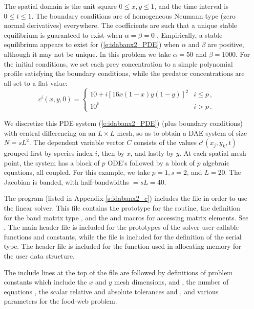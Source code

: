 The spatial domain is the unit square $0 \leq x,y \leq 1$, and the
time interval is $0 \leq t \leq 1$.  The boundary conditions are of
homogeneous Neumann type (zero normal derivatives) everywhere.  
The coefficients
are such that a unique stable equilibrium is guaranteed to exist when
$\alpha = \beta = 0$ \cite{Bro:86}.  Empirically, a stable equilibrium
appears to exist for (\ref{e:idabanx2_PDE}) when $\alpha$ and $\beta$ are
positive, although it may not be unique. In this problem we take
$\alpha = 50$ and $\beta = 1000$.  For the initial conditions, we set
each prey concentration to a simple polynomial profile satisfying the
boundary conditions, while the predator concentrations are all set to
a flat value:
\begin{equation*}
c^i(x,y,0) = 
\begin{cases}
  10 + i [16x(1 - x)y(1 - y)]^2 & i \leq p \, , \\
  10^5                          & i > p \, .
\end{cases}
\end{equation*}

We discretize this PDE system (\ref{e:idabanx2_PDE}) (plus boundary conditions)
with central differencing on an $L \times L$ mesh, so as to obtain a
DAE system of size $N = s L^2$.  The dependent variable vector $C$
consists of the values $c^i(x_j,y_k,t)$ grouped first by species index
$i$, then by $x$, and lastly by $y$.  At each spatial mesh point, the
system has a block of $p$ ODE's followed by a block of $p$ algebraic
equations, all coupled.
For this example, we take $p = 1, s = 2$, and $L = 20$.
The Jacobian is banded, with half-bandwidths  $= sL = 40$.

The  program (listed in Appendix \ref{s:idabanx2_c})
includes the file  in order to use the {\idaband} linear solver. 
This file contains the prototype for the  routine,
the definition for the band matrix type , and the
 and  macros for accessing matrix
elements. See .
The main {\ida} header file  is included for the prototypes of the
solver user-callable functions and {\ida} constants, while the file
 is included for the definition of the serial
 type.  The header file  is included for the
 function used in allocating memory for the user data structure.

The include lines at the top of the file are followed by definitions of
problem constants which include the $x$ and $y$ mesh dimensions,  and
, the number of equations , the scalar relative and absolute
tolerances  and , and various parameters for the food-web problem.

